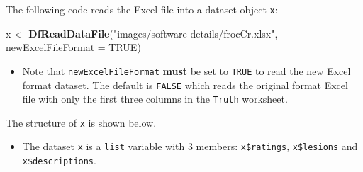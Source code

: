\documentclass[
]{book}
\newenvironment{Shaded}{\begin{snugshade}}{\end{snugshade}}
\newcommand{\CommentTok}[1]{\textcolor[rgb]{0.56,0.35,0.01}{\textit{#1}}}
\newcommand{\DataTypeTok}[1]{\textcolor[rgb]{0.13,0.29,0.53}{#1}}
\newcommand{\DecValTok}[1]{\textcolor[rgb]{0.00,0.00,0.81}{#1}}
\newcommand{\KeywordTok}[1]{\textcolor[rgb]{0.13,0.29,0.53}{\textbf{#1}}}
\newcommand{\NormalTok}[1]{#1}
\newcommand{\OperatorTok}[1]{\textcolor[rgb]{0.81,0.36,0.00}{\textbf{#1}}}
\newcommand{\OtherTok}[1]{\textcolor[rgb]{0.56,0.35,0.01}{#1}}
\newcommand{\StringTok}[1]{\textcolor[rgb]{0.31,0.60,0.02}{#1}}
\providecommand{\tightlist}{%
  \setlength{\itemsep}{0pt}\setlength{\parskip}{0pt}}
\begin{document}
The following code reads the Excel file into a dataset object \texttt{x}:

\begin{Shaded}
\begin{Highlighting}[]
\NormalTok{x <-}\StringTok{ }\KeywordTok{DfReadDataFile}\NormalTok{(}\StringTok{"images/software-details/frocCr.xlsx"}\NormalTok{, }\DataTypeTok{newExcelFileFormat =} \OtherTok{TRUE}\NormalTok{)}
\end{Highlighting}
\end{Shaded}

\begin{itemize}
\tightlist
\item
  Note that \texttt{newExcelFileFormat} \textbf{must} be set to \texttt{TRUE} to read the new Excel format dataset. The default is \texttt{FALSE} which reads the original format Excel file with only the first three columns in the \texttt{Truth} worksheet.
\end{itemize}

The structure of \texttt{x} is shown below.

\begin{Shaded}
\end{Shaded}

\begin{itemize}
\tightlist
\item
  The dataset \texttt{x} is a \texttt{list} variable with 3 members: \texttt{x\$ratings}, \texttt{x\$lesions} and \texttt{x\$descriptions}.
\end{itemize}

\begin{Shaded}
\end{Shaded}
\end{document}
